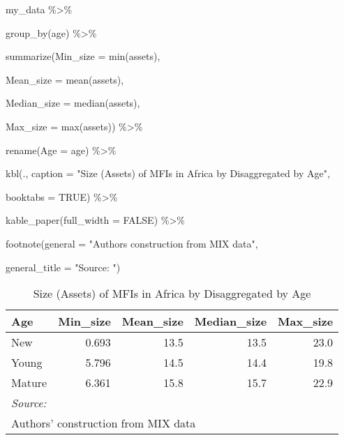 \documentclass[a4paper,nobind]{templates/ociamthesis}
\newenvironment{Shaded}{\begin{snugshade}}{\end{snugshade}}
\newcommand{\AttributeTok}[1]{\textcolor[rgb]{0.77,0.63,0.00}{#1}}
\newcommand{\ConstantTok}[1]{\textcolor[rgb]{0.00,0.00,0.00}{#1}}
\newcommand{\FunctionTok}[1]{\textcolor[rgb]{0.00,0.00,0.00}{#1}}
\newcommand{\NormalTok}[1]{#1}
\newcommand{\SpecialCharTok}[1]{\textcolor[rgb]{0.00,0.00,0.00}{#1}}
\newcommand{\StringTok}[1]{\textcolor[rgb]{0.31,0.60,0.02}{#1}}
\renewenvironment{Shaded}
{
  \vspace{10pt}%
  \begin{snugshade}%
}{%
  \end{snugshade}%
  \vspace{8pt}%
}
\begin{document}
\begin{Shaded}
\begin{Highlighting}[]
\NormalTok{my\_data }\SpecialCharTok{\%\textgreater{}\%} 
  
  \FunctionTok{group\_by}\NormalTok{(age) }\SpecialCharTok{\%\textgreater{}\%} 
  
  \FunctionTok{summarize}\NormalTok{(}\AttributeTok{Min\_size =} \FunctionTok{min}\NormalTok{(assets),}
    
            \AttributeTok{Mean\_size =} \FunctionTok{mean}\NormalTok{(assets), }
            
            \AttributeTok{Median\_size =} \FunctionTok{median}\NormalTok{(assets),}
            
            \AttributeTok{Max\_size =} \FunctionTok{max}\NormalTok{(assets)) }\SpecialCharTok{\%\textgreater{}\%} 
  
  \FunctionTok{rename}\NormalTok{(}\AttributeTok{Age =}\NormalTok{ age) }\SpecialCharTok{\%\textgreater{}\%} 
  
\FunctionTok{kbl}\NormalTok{(., }\AttributeTok{caption =} \StringTok{"Size (Assets) of MFIs in Africa by Disaggregated by Age"}\NormalTok{, }
      
      \AttributeTok{booktabs =} \ConstantTok{TRUE}\NormalTok{) }\SpecialCharTok{\%\textgreater{}\%} 
  
  \FunctionTok{kable\_paper}\NormalTok{(}\AttributeTok{full\_width =} \ConstantTok{FALSE}\NormalTok{) }\SpecialCharTok{\%\textgreater{}\%} 
  
  \FunctionTok{footnote}\NormalTok{(}\AttributeTok{general =} \StringTok{"Authors\textquotesingle{} construction from MIX data"}\NormalTok{,}
           
           \AttributeTok{general\_title =} \StringTok{"Source: "}\NormalTok{)}
\end{Highlighting}
\end{Shaded}

\begin{table}

\caption{\label{tab:unnamed-chunk-20}Size (Assets) of MFIs in Africa by Disaggregated by Age}
\centering
\begin{tabular}[t]{lrrrr}
\toprule
Age & Min\_size & Mean\_size & Median\_size & Max\_size\\
\midrule
New & 0.693 & 13.5 & 13.5 & 23.0\\
Young & 5.796 & 14.5 & 14.4 & 19.8\\
Mature & 6.361 & 15.8 & 15.7 & 22.9\\
\bottomrule
\multicolumn{5}{l}{\rule{0pt}{1em}\textit{Source: }}\\
\multicolumn{5}{l}{\rule{0pt}{1em}Authors' construction from MIX data}\\
\end{tabular}
\end{table}
\end{document}

